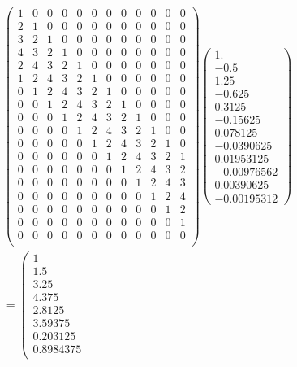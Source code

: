 \documentclass[journal,12pt,twocolumn]{IEEEtran}
\renewcommand\thesection{\arabic{section}}
\begin{document}
\begin{enumerate}[label=\thesection.\arabic*]
\begin{align}
	\left(	\begin{smallmatrix}
		1&0&0&0&0&0&0&0&0&0&0&0\\
		2&1&0&0&0&0&0&0&0&0&0&0\\
		3&2&1&0&0&0&0&0&0&0&0&0\\
		4&3&2&1&0&0&0&0&0&0&0&0\\
		2&4&3&2&1&0&0&0&0&0&0&0\\
		1&2&4&3&2&1&0&0&0&0&0&0\\
		0&1&2&4&3&2&1&0&0&0&0&0\\
		0&0&1&2&4&3&2&1&0&0&0&0\\
		0&0&0&1&2&4&3&2&1&0&0&0\\
		0&0&0&0&1&2&4&3&2&1&0&0\\
		0&0&0&0&0&1&2&4&3&2&1&0\\
		0&0&0&0&0&0&1&2&4&3&2&1\\
		0&0&0&0&0&0&0&1&2&4&3&2\\
		0&0&0&0&0&0&0&0&1&2&4&3\\
		0&0&0&0&0&0&0&0&0&1&2&4\\
		0&0&0&0&0&0&0&0&0&0&1&2\\
		0&0&0&0&0&0&0&0&0&0&0&1\\
		0&0&0&0&0&0&0&0&0&0&0&0\\
	\end{smallmatrix} \right)
	\left(\begin{smallmatrix}1.   \\      -0.5    \\     1.25   \\    -0.625   \\    0.3125  \\   -0.15625 \\ 0.078125  \\  -0.0390625 \\  0.01953125 \\ -0.00976562 \\ 0.00390625 \\ -0.00195312
	\end{smallmatrix} \right)\\
	= \left(\begin{smallmatrix}
		1 \\ 1.5 \\ 3.25\\ 4.375\\
		2.8125 \\ 3.59375 \\ 0.203125 \\ 0.8984375\\

\end{smallmatrix}
\end{align}
\end{enumerate}
\end{document}
